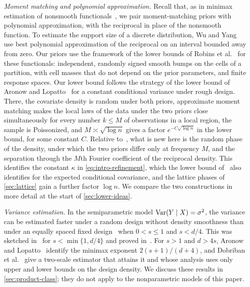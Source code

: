 \emph{Moment matching and polynomial approximation.} Recall that, as in
minimax estimation of nonsmooth
functionals~\cite{lepski,cailow,jiaovenkathanweissman,wuyangentropy,wuyang},
we pair moment-matching priors with polynomial approximation, with the
reciprocal in place of the nonsmooth function. To estimate the
support size of a discrete distribution, Wu and Yang~\cite{wuyang} use
best polynomial approximation of the reciprocal on an interval bounded
away from zero. Our priors use the framework of the lower bounds of Robins et
al.~\cite[Theorem~2.1 and Sections~3--4]{robins2009} for these
functionals: independent, randomly signed smooth bumps on the cells of
a partition, with cell masses that do not depend on the prior
parameters, and finite response spaces. Our lower bound follows the
strategy of the lower bound of Aronow and Lopatto~\cite{aronowlopatto} for a constant conditional
variance under rough design. There, the covariate density is random
under both priors, approximate moment matching makes the local laws of
the data under the two priors close simultaneously for every number
$k\le M$ of observations in a local region, the sample is Poissonized, and $M\asymp\sqrt{\log n}$ gives a factor
$e^{-C\sqrt{\log n}}$ in the lower bound, for some constant $C$.
Relative to~\cite{aronowlopatto}, what is new here is the random phase
of the density, under which the two priors differ only at frequency $M$,
and the separation through the $M$th Fourier coefficient of the
reciprocal density. This identifies the constant $\kappa$ in
\eqref{eq:intro-refinement}, which the lower bound of~\cite{park} also
identifies for the expected conditional covariance, and the lattice phases of
\cref{sec:lattice} gain a further factor $\log n$. We compare the two
constructions in more detail at the start of \cref{sec:lower-ideas}.

\emph{Variance estimation.} In the semiparametric model
$\operatorname{Var}(Y\mid X)=\sigma^2$, the variance can be estimated faster under a
random design without density smoothness than under an equally spaced
fixed design~\cite{wangvariance,caivariance} when $0<s\le1$ and
$s<d/4$. This was sketched in~\cite[Section~4]{hoif2008} for
$s<\min\{1,d/4\}$ and proved in~\cite{shen,aronowlopatto}. For $s>1$ and $d>4s$, Aronow and
Lopatto~\cite{aronowlopatto} identify the minimax exponent
$2(s+1)/(d+4)$, and Dobriban et al.~\cite{dobriban2026twoscale} give a
two-scale estimator that attains it and whose analysis uses only upper
and lower bounds on the design density. We discuss these results in \cref{sec:product-class};
they do not apply to the nonparametric models of this paper.

